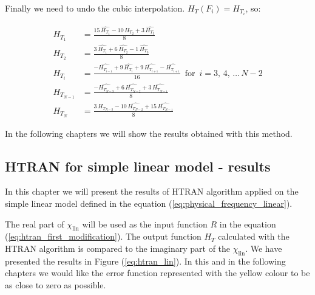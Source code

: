 \documentclass[12pt,twoside,a4paper]{article}
\numberwithin{equation}{subsection}
\numberwithin{figure}{subsection}
\begin{document}
Finally we need to undo the cubic interpolation. $ H_T(F_i) = H_{T_{i}} $, so: 

\begin{align}
  \label{eq:htundo_first}  
    H_{T_1}       & = \frac {15 \, \widehat{H_{T_1}} - 10 \, \widehat{H_{T_2}} + 3 \, \widehat{H_{T_3}}}{8} 
    \\
  \label{eq:htundo_second}
    H_{T_2}       & = \frac {3 \, \widehat{H_{T_1}} + 6 \, \widehat{H_{T_2}} - 1 \, \widehat{H_{T_3}}}{8} 
    \\ 
  \label{eq:htundo_next}
    H_{T_i}       & = \frac { - \widehat{H_{T_{i - 1}}} + 9 \, \widehat{H_{T_i}} + 9 \, \widehat{H_{T_{i + 1}}} - \widehat{ \mathit{H_{T_{i + 1}}}} }
                   {16} \, \mbox{ for } \, i = 3, \, 4, \, \ldots \, {N - 2} 
    \\ 
  \label{eq:htundo_prelast}
    H_{T_{N - 1}} & = \frac { - \widehat{H_{T_{N - 3}}} + 6 \, \widehat{H_{T_{N - 2}}} + 3 \, \widehat{H_{T_{N - 1}}}}{8} 
    \\
  \label{eq:htundo_last}
    H_{T_N}       & = \frac {3 \, \widehat{H_{T_{N - 3}}} - 10 \, \widehat{H_{T_{N - 2}}} + 15 \, \widehat{H_{T_{N - 1}}}}{8}  
\end{align}

In the following chapters we will show the results obtained with this method.

\subsection{HTRAN for simple linear model - results} \label{chap:htran_lin}

In this chapter we will present the results of HTRAN algorithm applied on the simple linear model defined in the equation (\ref{eq:physical_frequency_linear}).

The real part of $\chi_{\text{lin}}$ will be used as the input function $R$ in the equation (\ref{eq:htran_first_modification}). The output function $H_T$ calculated with the HTRAN algorithm is compared to the imaginary part of the $\chi_{\text{lin}}$. We have presented the results in Figure (\ref{eq:htran_lin}). In this and in the following chapters we would like the error function represented with the yellow colour to be as close to zero as possible. 
\end{document}
